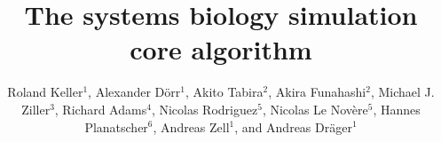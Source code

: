 \documentclass[10pt]{bmc_article}
\newenvironment{bmcformat}{\baselineskip20pt\sloppy\setboolean{publ}{false}}{\baselineskip20pt\sloppy}
\begin{document}
\begin{bmcformat}



\title{The systems biology simulation core algorithm}



\author{%
Roland Keller$^{1}$, %
Alexander D\"orr$^{1}$, %
Akito Tabira$^{2}$, %
Akira Funahashi$^{2}$, %
Michael J. Ziller$^{3}$, %
Richard Adams$^{4}$, %
Nicolas Rodriguez$^{5}$, %
Nicolas Le Nov\`{e}re$^{5}$, %
Hannes Planatscher$^{6}$, %
Andreas Zell$^{1}$, %
and Andreas Dr\"ager$^{1}$\correspondingauthor{}%
}


\address{%
\iid(1)Center for Bioinformatics Tuebingen (ZBIT), University of
Tuebingen, T\"ubingen, Germany
\iid(2)Keio University, Graduate School of
Science and Technology, Yokohama, Japan 
\iid(3)Department of Stem Cell and Regenerative Biology, Harvard University,
Cambridge, MA, USA
\iid(4)SynthSys Edinburgh, CH Waddington Building, University of Edinburgh,
Edinburgh EH9 3JD, UK
\iid(5)European Bioinformatics Institute, Wellcome Trust Genome Campus, Hinxton,
Cambridge, UK
\iid(6)Natural and Medical Sciences Institute at the University of Tuebingen,
Reutlingen, Germany}


\end{bmcformat}
\end{document}
